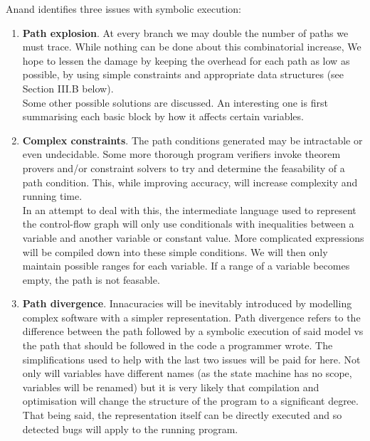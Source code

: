\documentclass[12pt,a4paper]{article}
\begin{document}
\noindent
Anand \cite[pp.~2--3]{anand} identifies three issues with symbolic execution:\\
\begin{enumerate}
\item \textbf{Path explosion}. At every branch we may double the number of paths we must trace. While
nothing can be done about this combinatorial increase, We hope to lessen the damage by keeping the overhead
for each path as low as possible, by using simple constraints and appropriate data structures (see Section III.B below).\\ %
Some other possible solutions are discussed. An interesting one is first summarising each basic block by how it affects certain variables.\\

\item \textbf{Complex constraints}. The path conditions generated may be intractable or even undecidable. Some more thorough program verifiers \citep{zhang, gupta}
invoke theorem provers and/or constraint solvers to try and determine the feasability of a path condition. This, while improving accuracy, will increase complexity
and running time.\\
In an attempt to deal with this, the intermediate language used to represent the control-flow graph will only
use conditionals with inequalities between a variable and another variable or constant value. More complicated expressions
will be compiled down into these simple conditions. We will then only maintain possible ranges for each variable. If a range of
a variable becomes empty, the path is not feasable.\\

\item \textbf{Path divergence}. Innacuracies will be inevitably introduced by modelling complex software with a simpler representation. Path divergence refers to the difference between the path followed by a symbolic execution of said model vs the path that
should be followed in the code a programmer wrote. The simplifications used to help with the last two issues will be paid for here. Not only will variables have different names (as the state machine has no scope, variables will be renamed) but it is very
likely that compilation and optimisation will change the structure of the program to a significant degree. That being said, the representation
itself can be directly executed and so detected bugs will apply to the running program.
\end{enumerate}
\end{document}
